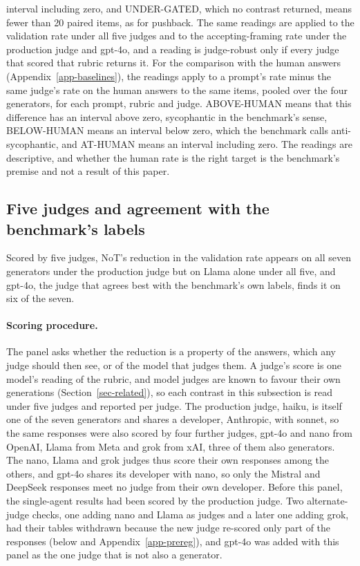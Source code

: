 interval including zero, and UNDER-GATED, which no contrast returned, means
fewer than 20 paired items, as for pushback. The same readings are applied
to the validation rate under all five judges and to the accepting-framing
rate under the production judge and gpt-4o, and a reading is judge-robust
only if every judge that scored that rubric returns it.
For the comparison with the human answers (Appendix~\ref{app-baselines}),
the readings apply to a prompt's rate minus the same judge's rate on the
human answers to the same items, pooled over the four generators, for each
prompt, rubric and judge. ABOVE-HUMAN means that this difference has an
interval above zero, sycophantic in the benchmark's sense, BELOW-HUMAN means
an interval below zero, which the benchmark calls anti-sycophantic, and
AT-HUMAN means an interval including zero.
The readings are descriptive, and
whether the human rate is the right target is the benchmark's premise and
not a result of this paper.

\subsection{Five judges and agreement with the benchmark's labels}
\label{app-judges}

Scored by five judges, NoT's reduction in the validation rate appears on all
seven generators under the production judge but on Llama alone under all
five, and gpt-4o, the judge that agrees best with the benchmark's own labels,
finds it on six of the seven.

\paragraph{Scoring procedure.}
The panel asks whether the reduction is a property of the answers, which any
judge should then see, or of the model that judges them. A judge's score is one model's reading of the rubric, and
model judges are known to favour their own generations
(Section~\ref{sec-related}), so each contrast in this subsection is read
under five judges and reported per judge. The production judge, haiku, is
itself one of the seven generators and shares a developer, Anthropic, with
sonnet, so the same responses were also scored by four further judges,
gpt-4o and nano from OpenAI, Llama from Meta and grok from xAI, three of them
also generators. The nano,
Llama and grok judges thus score their own responses among the others, and
gpt-4o shares its developer with nano, so only the Mistral and DeepSeek
responses meet no judge from their own developer. Before this panel, the
single-agent results had been scored by the production judge. Two
alternate-judge checks, one adding nano and Llama as judges and a later one
adding grok, had their tables withdrawn because the new judge re-scored only
part of the responses (below and Appendix~\ref{app-prereg}), and gpt-4o was
added with this panel as the one judge that is not also a generator.

